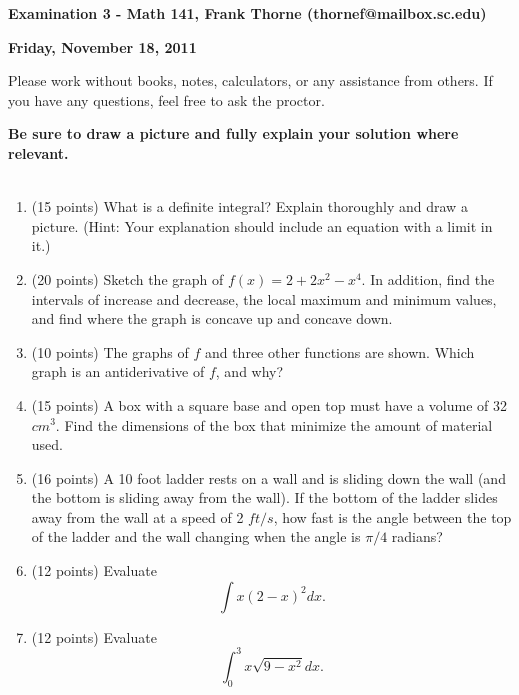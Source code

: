 \documentclass[12pt]{article}
\begin{document}
\setlength{\topmargin}{-2mm}





\begin{center}{\bf Examination 3 - Math 141, Frank Thorne (thornef@mailbox.sc.edu)}
\end{center}
\begin{center}
{\bf Friday, November 18, 2011}
\end{center}

Please work without books, notes, calculators, or any assistance from others. If you have
any questions, feel free to ask the proctor. 

{\bf Be sure to draw a picture and fully explain your solution where relevant.}
\\
\\
\begin{enumerate}[(1)]
\item (15 points)
What is a definite integral? Explain thoroughly and draw a picture. (Hint: Your explanation
should include an equation with a limit in it.)

\item (20 points)
Sketch the graph of $f(x) = 2 + 2x^2 - x^4$. In addition, find the intervals of increase
and decrease, the local maximum and minimum values, and find where the graph is concave up
and concave down.

\item (10 points)
The graphs of $f$ and three other functions are shown. Which graph is an antiderivative
of $f$, and why?

\item (15 points)
A box with a square base and open top must have a volume of 32 $cm^3$. Find the dimensions
of the box that minimize the amount of material used.

\item (16 points)
A 10 foot ladder rests on a wall and is sliding down the wall (and the bottom is sliding
away from the wall). If the bottom of the ladder slides away from the wall at a speed of
2 $ft/s$, how fast is the angle between the top of the ladder and the wall changing when
the angle is $\pi/4$ radians?

\item (12 points)
Evaluate
$$\int x (2 - x)^2 dx.$$

\item (12 points)
Evaluate
$$\int_0^3 x \sqrt{9 - x^2} dx.$$

\end{enumerate}
\end{document}
